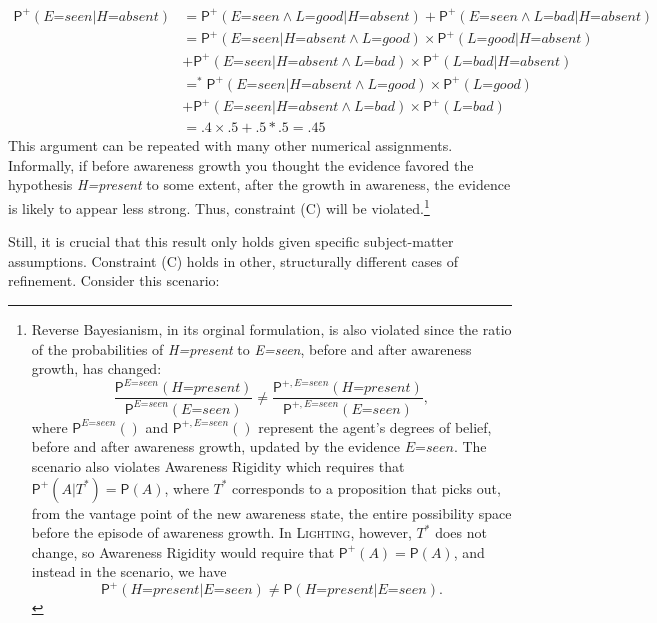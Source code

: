 \documentclass[
  11pt,
  dvipsnames,enabledeprecatedfontcommands, todos]{scrartcl}
\newcommand{\pr}[1]{\ensuremath{\mathsf{P}(#1)}}
\newcommand{\ppr}[2]{\ensuremath{\mathsf{P}^{#1}(#2)}}
\begin{document}
{\begin{align*}
  \ppr{+}{\textit{E=seen} \vert \textit{H=absent}} &= \ppr{+}{\textit{E=seen} \wedge \textit{L=good} \vert \textit{H=absent}}+\ppr{+}{\textit{E=seen} \wedge \textit{L=bad} \vert \textit{H=absent}}\\
  &= \ppr{+}{\textit{E=seen} \vert \textit{H=absent} \wedge \textit{L=good}}  \times \ppr{+}{\textit{L=good} \vert  \textit{H=absent} }\\ & +\ppr{+}{\textit{E=seen}  \vert \textit{H=absent} \wedge \textit{L=bad}} \times \ppr{+}{\textit{L=bad} \vert  \textit{H=absent}}\\
  &=^* \ppr{+}{\textit{E=seen} \vert \textit{H=absent} \wedge \textit{L=good}}  \times \ppr{+}{\textit{L=good}}\\ & +\ppr{+}{\textit{E=seen}  \vert \textit{H=absent} \wedge \textit{L=bad}} \times \ppr{+}{\textit{L=bad}}\\
  &= .4 \times .5 +.5 *.5 = .45 
  \end{align*} This argument can be repeated with many other numerical
  assignments.} Informally, if before awareness growth you thought the
evidence favored the hypothesis \textit{H=present} to some extent, after
the growth in awareness, the evidence is likely to appear less strong.
Thus, constraint (C) will be violated.\footnote{Reverse Bayesianism, in
  its orginal formulation, is also violated since the ratio of the
  probabilities of \textit{H=present} to \textit{E=seen}, before and
  after awareness growth, has changed:
  \[\frac{\ppr{\textit{E=seen}}{\textit{H=present}}}{\ppr{ \textit{E=seen}}{\textit{E=seen}}} \neq \frac{\ppr{+, \textit{E=seen}}{\textit{H=present}}}{\ppr{+, \textit{E=seen}}{\textit{E=seen}}},\]
  where \(\ppr{\textit{E=seen}}{}\) and \(\ppr{+, \textit{E=seen}}{}\)
  represent the agent's degrees of belief, before and after awareness
  growth, updated by the evidence \(\textit{E=seen}\). The scenario also
  violates Awareness Rigidity which requires that
  \(\ppr{+}{A \vert T^*}=\pr{A}\), where \(T^*\) corresponds to a
  proposition that picks out, from the vantage point of the new
  awareness state, the entire possibility space before the episode of
  awareness growth. In \textsc{Lighting}, however, \(T^*\) does not
  change, so Awareness Rigidity would require that
  \(\ppr{+}{A}=\pr{A}\), and instead in the scenario, we have
  \[\ppr{+}{\textit{H=present} \vert \textit{E=seen}} \neq \pr{\textit{H=present} \vert \textit{E=seen}}.\]}

Still, it is crucial that this result only holds given specific
subject-matter assumptions. Constraint (C) holds in other, structurally
different cases of refinement. Consider this scenario:
\end{document}
